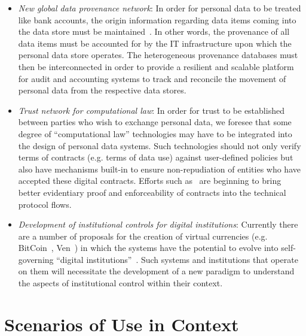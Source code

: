 \begin{itemize}
\item  {\em New global data provenance network}:  In order for personal data to be treated
like bank accounts, the origin information regarding data items coming into the data store
must be maintained~\cite{HardjonoGreenwood2013}. 
In other words, the provenance of all data items must be
accounted for by the IT infrastructure upon which the personal data store operates.
The heterogeneous provenance databases must then be interconnected in order
to provide a resilient and scalable platform for audit and accounting systems
to track and reconcile the movement of personal data from the respective data stores.

\item  {\em Trust network for computational law}: In order for trust to be established between
parties who wish to exchange personal data, we foresee that some degree of ``computational law''
technologies may have to be integrated into the design of personal data systems.
Such technologies should not only verify terms of contracts (e.g. terms of data use) against user-defined policies
but also have mechanisms built-in to ensure non-repudiation of entities
who have accepted these digital contracts.
Efforts such as~\cite{UMAcore,UMABindingObligations} are beginning to bring better evidentiary proof and enforceability of contracts
into the technical protocol flows.

\item  {\em Development of institutional controls for digital institutions}:
Currently there are a number of proposals for the creation of virtual currencies (e.g. BitCoin~\cite{BarberBoyen2012}, Ven~\cite{Stalnaker2013})
in which the systems have the potential to evolve into self-governing ``digital institutions''~\cite{HardjonoDeegan2014}.
Such systems and institutions that operate on them will necessitate the development of a new paradigm
to understand the aspects of institutional control within their context.


\end{itemize}



\section{Scenarios of Use in Context}

